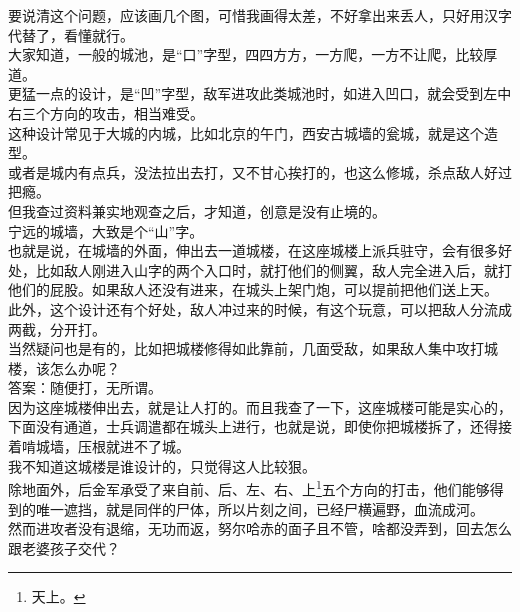 \begin{multicols}{\theparacolNo}
要说清这个问题，应该画几个图，可惜我画得太差，不好拿出来丢人，只好用汉字代替了，看懂就行。\\

大家知道，一般的城池，是“口”字型，四四方方，一方爬，一方不让爬，比较厚道。\\

更猛一点的设计，是“凹”字型，敌军进攻此类城池时，如进入凹口，就会受到左中右三个方向的攻击，相当难受。\\

这种设计常见于大城的内城，比如北京的午门，西安古城墙的瓮城，就是这个造型。\\

或者是城内有点兵，没法拉出去打，又不甘心挨打的，也这么修城，杀点敌人好过把瘾。\\

但我查过资料兼实地观查之后，才知道，创意是没有止境的。\\

宁远的城墙，大致是个“山”字。\\

也就是说，在城墙的外面，伸出去一道城楼，在这座城楼上派兵驻守，会有很多好处，比如敌人刚进入山字的两个入口时，就打他们的侧翼，敌人完全进入后，就打他们的屁股。如果敌人还没有进来，在城头上架门炮，可以提前把他们送上天。\\

此外，这个设计还有个好处，敌人冲过来的时候，有这个玩意，可以把敌人分流成两截，分开打。\\

当然疑问也是有的，比如把城楼修得如此靠前，几面受敌，如果敌人集中攻打城楼，该怎么办呢？\\

答案：随便打，无所谓。\\

因为这座城楼伸出去，就是让人打的。而且我查了一下，这座城楼可能是实心的，下面没有通道，士兵调遣都在城头上进行，也就是说，即使你把城楼拆了，还得接着啃城墙，压根就进不了城。\\

我不知道这城楼是谁设计的，只觉得这人比较狠。\\

除地面外，后金军承受了来自前、后、左、右、上\footnote{天上。}五个方向的打击，他们能够得到的唯一遮挡，就是同伴的尸体，所以片刻之间，已经尸横遍野，血流成河。\\

然而进攻者没有退缩，无功而返，努尔哈赤的面子且不管，啥都没弄到，回去怎么跟老婆孩子交代？\\


\end{multicols}
